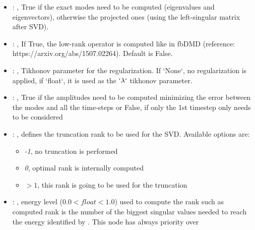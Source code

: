 \begin{itemize}
    \item {}: ,
      True if the exact modes need to be computed (eigenvalues and
      eigenvectors),   otherwise the projected ones (using the left-singular matrix after SVD).

    \item {}: ,
      If True, the low-rank operator is computed like in fbDMD (reference:
      https://arxiv.org/abs/1507.02264).                                                  Default is
      False.

    \item {}: ,
      Tikhonov parameter for the regularization.                                                  If
      `None`, no regularization is applied, if `float`, it is used as the
      $`\lambda`$ tikhonov parameter.

    \item {}: ,
      True if the amplitudes need to be computed minimizing the error
      between the modes and all the time-steps or False, if only the 1st timestep only needs to be
      considered

    \item {}: ,
      defines the truncation rank to be used for the SVD.
      Available options are:                                                  \begin{itemize}
      \item \textit{-1}, no truncation is performed
      \item \textit{0}, optimal rank is internally computed
      \item \textit{$>1$}, this rank is going to be used for the truncation
      \end{itemize}

    \item {}: ,
      energy level ($0.0 < float < 1.0$) used to compute the rank such
      as computed rank is the number of the biggest singular values needed to reach the energy
      identified by                                                    . This
      node has always priority over  


\end{itemize}
